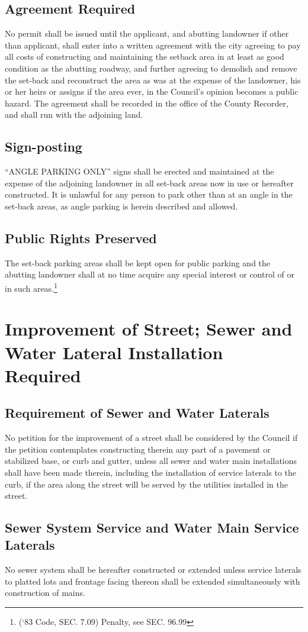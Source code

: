 \subsection{Agreement Required}
No permit shall be issued until the applicant, and abutting landowner if other than applicant, shall enter into a written agreement with the city agreeing to pay all costs of constructing and maintaining the setback area in at least as good condition as the abutting roadway, and further agreeing to demolish and remove the set-back and reconstruct the area as was at the expense of the landowner, his or her heirs or assigns if the area ever, in the Council’s opinion becomes a public hazard.  The agreement shall be recorded in the office of the County Recorder, and shall run with the adjoining land.
\subsection{Sign-posting}
“ANGLE PARKING ONLY” signs shall be erected and maintained at the expense of the adjoining landowner in all set-back areas now in use or hereafter constructed.  It is unlawful for any person to park other than at an angle in the set-back areas, as angle parking is herein described and allowed.
\subsection{Public Rights Preserved}
The set-back parking areas shall be kept open for public parking and the abutting landowner shall at no time acquire any special interest or control of or in such areas.\footnote{(‘83 Code, SEC. 7.09)  Penalty, see SEC. 96.99}
\section{Improvement of Street; Sewer and Water Lateral Installation Required}
\subsection{Requirement of Sewer and Water Laterals}
No petition for the improvement of a street shall be considered by the Council if the petition contemplates constructing therein any part of a pavement or stabilized base, or curb and gutter, unless all sewer and water main installations shall have been made therein, including the installation of service laterals to the curb, if the area along the street will be served by the utilities installed in the street.
\subsection{Sewer System Service and Water Main Service Laterals}
No sewer system shall be hereafter constructed or extended unless service laterals to platted lots and frontage facing thereon shall be extended simultaneously with construction of mains.
